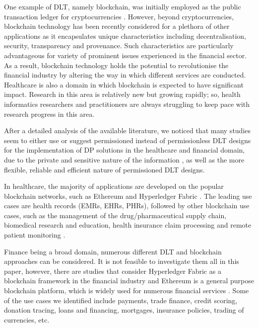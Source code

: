 One example of DLT, namely blockchain, was initially employed as the public transaction ledger for cryptocurrencies \cite{bitcoin}. However, beyond cryptocurrencies, blockchain technology has been recently considered for a plethora of other applications \cite{dlt_2,walmart,health_1,DP_storagesys} as it encapsulates unique characteristics including decentralisation, security, transparency and provenance. Such characteristics are particularly advantageous for variety of prominent issues experienced in the financial sector. As a result, blockchain technology holds the potential to revolutionise the financial industry by altering the way in which different services are conducted. Healthcare is also a domain in which blockchain is expected to have significant impact. Research in this area is relatively new but growing rapidly; so, health informatics researchers and practitioners are always struggling to keep pace with research progress in this area. 

After a detailed analysis of the available literature, we noticed that many studies seem to either use or suggest permissioned instead of permissionless DLT designs for the implementation of DP solutions in the healthcare and financial domain, due to the private and sensitive nature of the information \cite{hasselgren2020blockchain}, as well as the more flexible, reliable and efficient nature of permissioned DLT designs. 

In healthcare, the majority of applications are developed on the popular blockchain networks, such as Ethereum and Hyperledger Fabric \cite{agbo2019blockchain,hasselgren2020blockchain, dagher2018ancile, haq2018blockchain, health_4,ramani2018secure, health_5,health_1}. The leading use cases are health records (EMRs, EHRs, PHRs), followed by other blockchain use cases, such as the management of the drug/pharmaceutical supply chain, biomedical research and education, health insurance claim processing and remote patient monitoring \cite{holbl2018systematic,agbo2019blockchain}.

Finance being a broad domain, numerous different DLT and blockchain approaches can be considered. It is not feasible to investigate them all in this paper, however, there are studies that consider Hyperledger Fabric as a blockchain framework in the financial industry \cite{bettio2019hyperledger,chen2018blockchain,ariffin2019design,ma2019privacy} and Ethereum is a general purpose blockchain platform, which is widely used for numerous financial services \cite{tikhomirov2017ethereum}. Some of the use cases we identified include payments, trade finance, credit scoring, donation tracing, loans and financing, mortgages, insurance policies, trading of currencies, etc.

